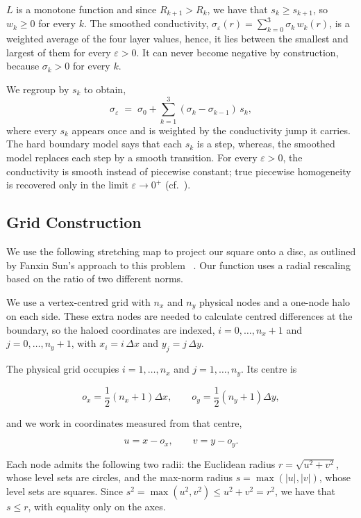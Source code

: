 \documentclass[final-report]{report-template}
\begin{document}
$L$ is a monotone function and since $R_{k+1} > R_{k}$, we have that $s_k \ge s_{k+1}$, so $w_k \ge 0$ for every $k$. The smoothed conductivity, $\sigma_\varepsilon(r) = \sum_{k=0}^{3} \sigma_k \, w_k(r)$, is a weighted average of the four layer values, hence, it lies between the smallest and largest of them for every $\varepsilon > 0$. It can never become negative by construction, because $\sigma_k > 0$ for every $k$.

We regroup by $s_k$ to obtain,
$$
\sigma_\varepsilon \;=\; \sigma_0 + \sum_{k=1}^{3} (\sigma_k - \sigma_{k-1}) \, s_k ,
$$
where every $s_k$ appears once and is weighted by the conductivity jump it carries. The hard boundary model says that each $s_k$ is a step, whereas, the smoothed model replaces each step by a smooth transition. For every $\varepsilon > 0$, the conductivity is smooth instead of piecewise constant; true piecewise homogeneity is recovered only in the limit $\varepsilon \to 0^{+}$ (cf.~\cite{burger2017}).

\subsection{Grid Construction}

We use the following stretching map to project our square onto a disc, as outlined by Fanxin Sun's approach to this problem ~\cite{Sun2025}. Our function uses a radial rescaling based on the ratio of two different norms.

We use a vertex-centred grid with \(n_x\) and \(n_y\) physical nodes and a one-node halo on each side. These extra nodes are needed to calculate centred differences at the boundary, so the haloed coordinates are indexed, \(i=0,\ldots,n_x+1\) and \(j=0,\ldots,n_y+1\), with $x_i=i\,\Delta x$ and $y_j=j\,\Delta y.$

The physical grid occupies $i=1,\ldots,n_x$ and $j=1,\ldots,n_y$. Its centre is

$$
o_x=\frac{1}{2}(n_x+1)\Delta x,
\qquad
o_y=\frac{1}{2}(n_y+1)\Delta y,
$$

and we work in coordinates measured from that centre,

$$
u=x-o_x,
\qquad
v=y-o_y.
$$


Each node admits the following two radii: the Euclidean radius $r = \sqrt{u^2+v^2}$, whose level sets are circles, and the max-norm radius $s = \max(|u|,|v|)$, whose level sets are squares. Since $s^2 = \max(u^2,v^2) \le u^2 + v^2 = r^2$, we have that $s \le r$, with equality only on the axes.
\end{document}

